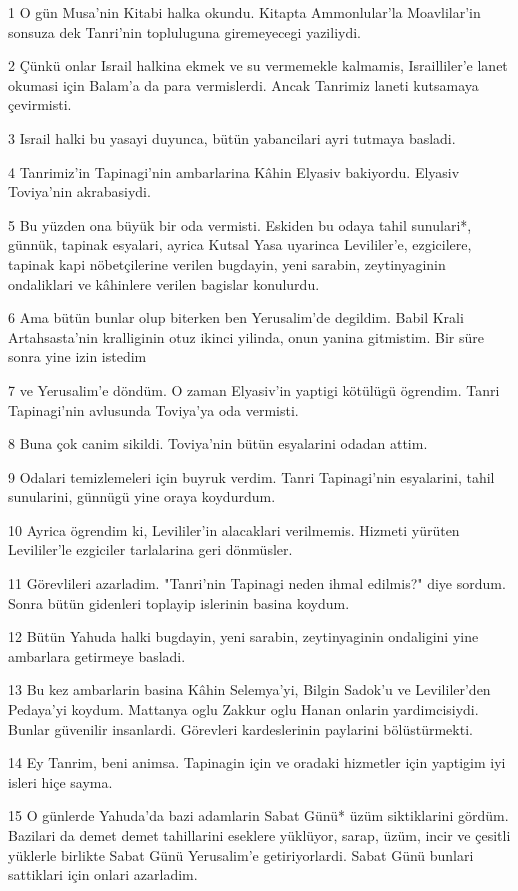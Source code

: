 \par 1 O gün Musa'nin Kitabi halka okundu. Kitapta Ammonlular'la Moavlilar'in sonsuza dek Tanri'nin topluluguna giremeyecegi yaziliydi.
\par 2 Çünkü onlar Israil halkina ekmek ve su vermemekle kalmamis, Israilliler'e lanet okumasi için Balam'a da para vermislerdi. Ancak Tanrimiz laneti kutsamaya çevirmisti.
\par 3 Israil halki bu yasayi duyunca, bütün yabancilari ayri tutmaya basladi.
\par 4 Tanrimiz'in Tapinagi'nin ambarlarina Kâhin Elyasiv bakiyordu. Elyasiv Toviya'nin akrabasiydi.
\par 5 Bu yüzden ona büyük bir oda vermisti. Eskiden bu odaya tahil sunulari*, günnük, tapinak esyalari, ayrica Kutsal Yasa uyarinca Levililer'e, ezgicilere, tapinak kapi nöbetçilerine verilen bugdayin, yeni sarabin, zeytinyaginin ondaliklari ve kâhinlere verilen bagislar konulurdu.
\par 6 Ama bütün bunlar olup biterken ben Yerusalim'de degildim. Babil Krali Artahsasta'nin kralliginin otuz ikinci yilinda, onun yanina gitmistim. Bir süre sonra yine izin istedim
\par 7 ve Yerusalim'e döndüm. O zaman Elyasiv'in yaptigi kötülügü ögrendim. Tanri Tapinagi'nin avlusunda Toviya'ya oda vermisti.
\par 8 Buna çok canim sikildi. Toviya'nin bütün esyalarini odadan attim.
\par 9 Odalari temizlemeleri için buyruk verdim. Tanri Tapinagi'nin esyalarini, tahil sunularini, günnügü yine oraya koydurdum.
\par 10 Ayrica ögrendim ki, Levililer'in alacaklari verilmemis. Hizmeti yürüten Levililer'le ezgiciler tarlalarina geri dönmüsler.
\par 11 Görevlileri azarladim. "Tanri'nin Tapinagi neden ihmal edilmis?" diye sordum. Sonra bütün gidenleri toplayip islerinin basina koydum.
\par 12 Bütün Yahuda halki bugdayin, yeni sarabin, zeytinyaginin ondaligini yine ambarlara getirmeye basladi.
\par 13 Bu kez ambarlarin basina Kâhin Selemya'yi, Bilgin Sadok'u ve Levililer'den Pedaya'yi koydum. Mattanya oglu Zakkur oglu Hanan onlarin yardimcisiydi. Bunlar güvenilir insanlardi. Görevleri kardeslerinin paylarini bölüstürmekti.
\par 14 Ey Tanrim, beni animsa. Tapinagin için ve oradaki hizmetler için yaptigim iyi isleri hiçe sayma.
\par 15 O günlerde Yahuda'da bazi adamlarin Sabat Günü* üzüm siktiklarini gördüm. Bazilari da demet demet tahillarini eseklere yüklüyor, sarap, üzüm, incir ve çesitli yüklerle birlikte Sabat Günü Yerusalim'e getiriyorlardi. Sabat Günü bunlari sattiklari için onlari azarladim.
